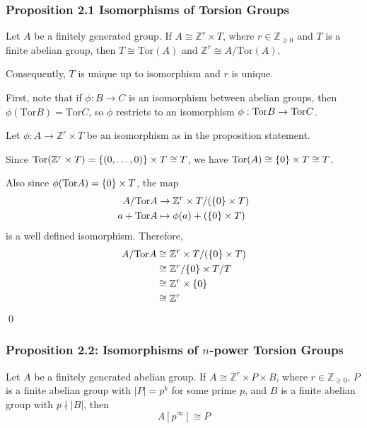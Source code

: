 \documentclass{article}
\renewenvironment{proof}{{\bfseries\color{blue1} Proof:}}{\qed}
\begin{document}
\subsubsection{Proposition 2.1 Isomorphisms of Torsion Groups}
\begin{idea}
    Let $A$ be a finitely generated group. If $A \cong \mathbb{Z}^r \times T$, where $r \in \mathbb{Z}_{\ge 0}$ and $T$ is a finite abelian group, then $T \cong \text{Tor}(A)$ and $\mathbb{Z}^r \cong A/\text{Tor}(A)$.
    \vspace{2mm}

    Consequently, $T$ is unique up to isomorphism and $r$ is unique.
\end{idea}
\begin{proof}
    First, note that if $\phi: B\rightarrow C$ is an isomorphism between abelian groups, then $\phi(\text{Tor}B)=\text{Tor}C$, so $\phi$ restricts to an isomorphism $\phi: \mathrm{Tor} B \rightarrow \mathrm{Tor} C$.

    Let $\phi: A\rightarrow \mathbb{Z}^r \times T$ be an isomorphism as in the proposition statement.

    Since $\mathrm{Tor}(\mathbb{Z}^r \times T) = \{(0,\dots,0)\} \times T \cong T$, we have $\mathrm{Tor}(A) \cong \{0\} \times T \cong T$.

    Also since $\phi(\mathrm{Tor} A)= \{0\} \times T$, the map
    \begin{align*}
        A/\mathrm{Tor} A   & \rightarrow \mathbb{Z}^r \times T/(\{0\} \times T) \\
        a + \mathrm{Tor} A & \mapsto \phi(a) + (\{0\} \times T)
    \end{align*}
    is a well defined isomorphism. Therefore,
    \begin{align*}
        A/\mathrm{Tor} A & \cong \mathbb{Z}^r \times T/(\{0\} \times T) \\
                 & \cong \mathbb{Z}^r/\{0\} \times T/T          \\
                 & \cong \mathbb{Z}^r \times \{0\}              \\
                 & \cong \mathbb{Z}^r
    \end{align*}
\end{proof}
\subsubsection{Proposition 2.2: Isomorphisms of $n$-power Torsion Groups}
\begin{idea}
    Let $A$ be a finitely generated abelian group. If $A \cong \mathbb{Z}^r \times P \times B$, where $r \in \mathbb{Z}_{\ge 0}$, $P$ is a finite abelian group with $|P|=p^k$ for some prime $p$, and $B$ is a finite abelian group with $p\nmid |B|$, then
    \begin{equation*}
        A[p^\infty] \cong P
    \end{equation*}
\end{idea}
\end{document}
